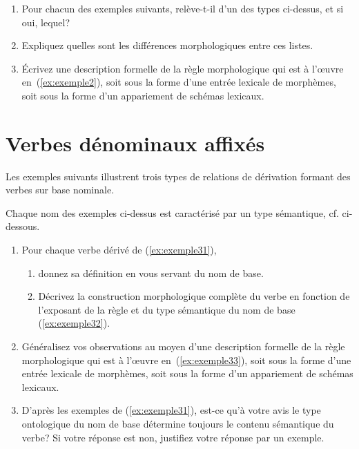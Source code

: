 \begin{enumerate}
\item Pour chacun des exemples suivants, relève-t-il d'un des types ci-dessus, et si oui, lequel?
  \begin{exe}
    \ex \exdeuxaclasser
  \end{exe}
\item Expliquez quelles sont les différences morphologiques entre ces listes.
\item Écrivez une description formelle de la règle morphologique qui est à l'œuvre en~(\ref{ex:exemple2}), soit sous la forme d'une entrée lexicale de morphèmes, soit sous la forme d'un appariement de schémas lexicaux.
\end{enumerate}

\section{Verbes dénominaux affixés}

Les exemples suivants illustrent trois types de relations de dérivation formant des verbes sur base nominale. 

\begin{exe}
  \ex \label{ex:exemple31}
  \begin{xlist}
    \ex \extroisapanifier  
    \ex  \extroisaembrasser
    \ex \extroisavampiriser
  \end{xlist}
\end{exe}

Chaque nom des exemples ci-dessus est caractérisé par un type sémantique, cf. ci-dessous.

\begin{exe}
\ex \label{ex:exemple32} \begin{xlist}
\ex \extroisbpain
\ex \label{ex:exemple33}\extroisbbras
\ex \extroisbvampire
\end{xlist}
\end{exe}

\begin{enumerate}
\item Pour chaque verbe dérivé de (\ref{ex:exemple31}), 
  \begin{enumerate}
  \item donnez sa  définition en vous servant du nom de base.
  \item Décrivez la construction morphologique complète du verbe en fonction de l'exposant de la règle et du type sémantique du nom de base (\ref{ex:exemple32}).
  \end{enumerate}   
\item Généralisez vos observations au moyen d'une description formelle de la règle morphologique qui est à l'œuvre en~(\ref{ex:exemple33}), soit sous la forme d'une entrée lexicale de morphèmes, soit sous la forme d'un appariement de schémas lexicaux.
\item D'après les exemples de (\ref{ex:exemple31}), est-ce qu'à votre avis le type ontologique du nom de base détermine toujours le contenu sémantique du verbe? Si votre réponse est non, justifiez votre réponse par un exemple. 
\end{enumerate}

